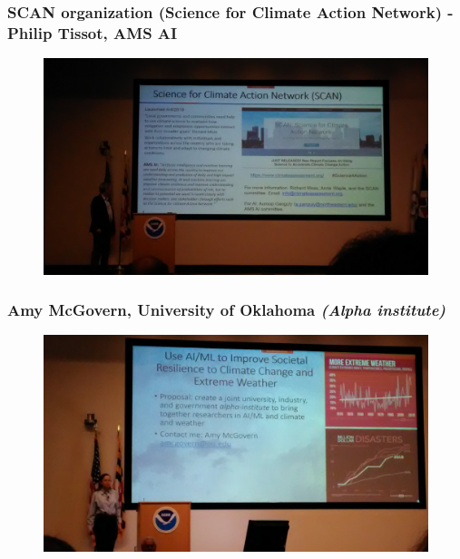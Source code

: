 \documentclass{beamer}
\begin{document}
\begin{frame}
\frametitle{SCAN organization (Science for Climate Action Network) - Philip Tissot, AMS AI}
\begin{figure}
	\includegraphics[width=\linewidth]{figs/P_20190423_105212.jpg}
\end{figure}
\end{frame}

\begin{frame}
\frametitle{Amy McGovern, University of Oklahoma \textit{(Alpha institute)}}
\begin{figure}
	\includegraphics[width=\linewidth]{figs/P_20190425_105024.jpg}
\end{figure}
\end{frame}
\end{document}
